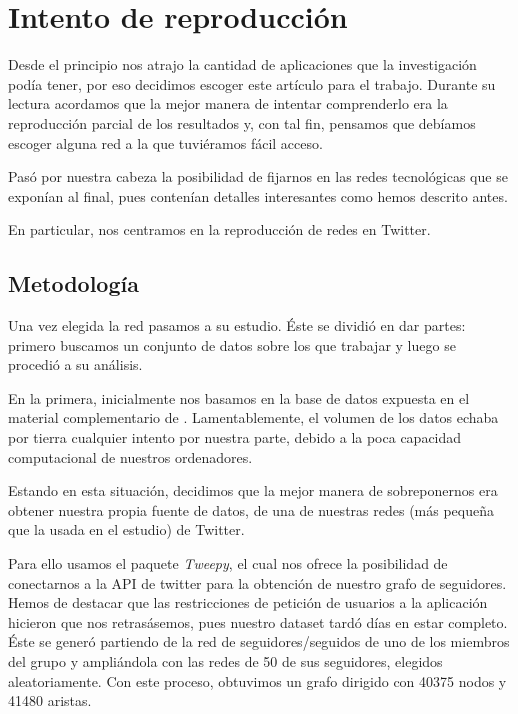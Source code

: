 \documentclass[1p]{elsarticle}
\begin{document}
\section{Intento de reproducción}

Desde el principio nos atrajo la cantidad de aplicaciones que la investigación podía tener, por eso decidimos escoger este artículo para el trabajo. Durante su lectura acordamos que la mejor manera de intentar comprenderlo era la reproducción parcial de los resultados y, con tal fin, pensamos que debíamos escoger alguna red a la que tuviéramos fácil acceso.

Pasó por nuestra cabeza la posibilidad de fijarnos en las redes tecnológicas que se exponían al final, pues contenían detalles interesantes como hemos descrito antes.

En particular, nos centramos en la reproducción de redes en Twitter. 

\subsection{Metodología}
    Una vez elegida la red pasamos a su estudio.
    Éste se dividió en dar partes: primero buscamos un conjunto de datos sobre los que trabajar y luego se procedió a su análisis.
    
    En la primera, inicialmente nos basamos en la base de datos expuesta en el material complementario de \cite{arti}. 
    Lamentablemente, el volumen de los datos echaba por tierra cualquier intento por nuestra parte, debido a la poca capacidad computacional de nuestros ordenadores.

Estando en esta situación, decidimos que la mejor manera de sobreponernos era obtener nuestra propia fuente de datos, de una de nuestras redes (más pequeña que la usada en el estudio) de Twitter.

    Para ello usamos el paquete \textit{Tweepy}, el cual nos ofrece la posibilidad de conectarnos a la API de twitter para la obtención de nuestro grafo de seguidores.
    Hemos de destacar que las restricciones de petición de usuarios a la aplicación hicieron que nos retrasásemos, pues nuestro dataset tardó días en estar completo.
    Éste se generó partiendo de la red de seguidores/seguidos de uno de los miembros del grupo y ampliándola con las redes de 50 de sus seguidores, elegidos aleatoriamente.
    Con este proceso, obtuvimos un grafo dirigido con 40375 nodos y 41480 aristas.
\end{document}
